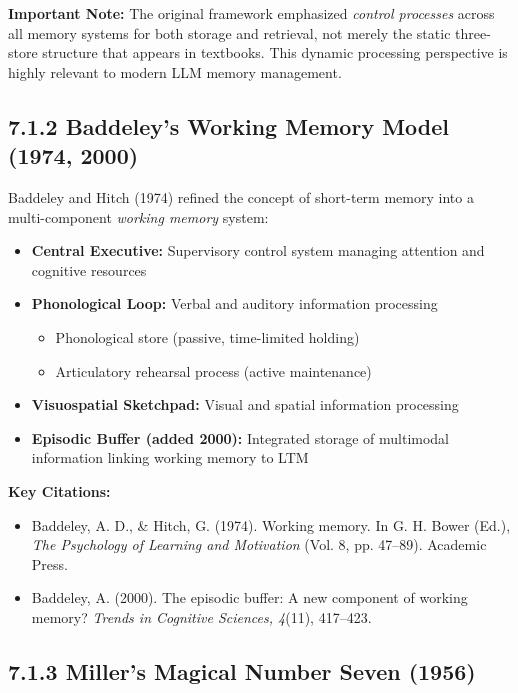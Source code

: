 \documentclass[11pt,letterpaper]{article}
\begin{document}
\textbf{Important Note:} The original framework emphasized \textit{control processes} across all memory systems for both storage and retrieval, not merely the static three-store structure that appears in textbooks. This dynamic processing perspective is highly relevant to modern LLM memory management.

\subsection{7.1.2 Baddeley's Working Memory Model (1974, 2000)}

Baddeley and Hitch (1974) refined the concept of short-term memory into a multi-component \textit{working memory} system:

\begin{itemize}[leftmargin=*]
    \item \textbf{Central Executive:} Supervisory control system managing attention and cognitive resources
    \item \textbf{Phonological Loop:} Verbal and auditory information processing
    \begin{itemize}
        \item Phonological store (passive, time-limited holding)
        \item Articulatory rehearsal process (active maintenance)
    \end{itemize}
    \item \textbf{Visuospatial Sketchpad:} Visual and spatial information processing
    \item \textbf{Episodic Buffer (added 2000):} Integrated storage of multimodal information linking working memory to LTM
\end{itemize}

\textbf{Key Citations:}
\begin{itemize}[leftmargin=*]
    \item Baddeley, A. D., \& Hitch, G. (1974). Working memory. In G. H. Bower (Ed.), \textit{The Psychology of Learning and Motivation} (Vol. 8, pp. 47--89). Academic Press.
    \item Baddeley, A. (2000). The episodic buffer: A new component of working memory? \textit{Trends in Cognitive Sciences, 4}(11), 417--423.
\end{itemize}

\subsection{7.1.3 Miller's Magical Number Seven (1956)}
\end{document}

